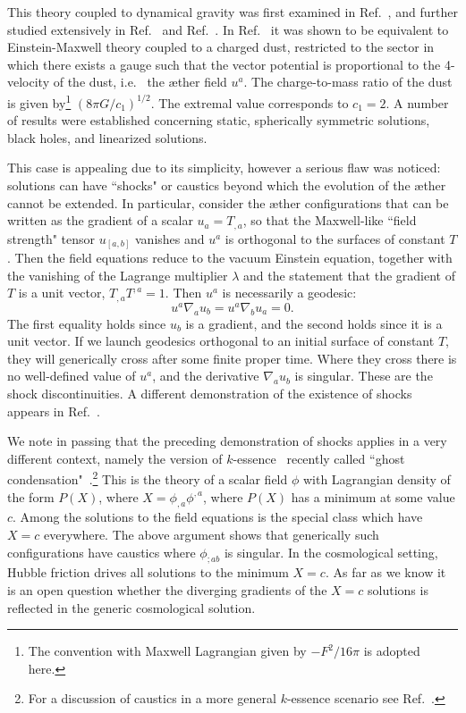 \documentclass[aps]{ws-procs9x6}
\def\beq{\begin{equation}}
\def\eeq{\end{equation}}
\def\l{\lambda}
\begin{document}
This theory coupled to dynamical gravity was first examined in
Ref.~, and further studied extensively in
Ref.~ and Ref.~. In Ref.~
it was shown to be equivalent to Einstein-Maxwell theory coupled
to a charged dust, restricted to the sector in which there exists
a gauge such that the vector potential is proportional to the
4-velocity of the dust, i.e.~ the {\ae}ther field $u^a$. The
charge-to-mass ratio of the dust is given by\footnote{The
convention with Maxwell Lagrangian given by $-F^2/16\pi$ is
adopted here.} $(8\pi G/c_1)^{1/2}$. The extremal value
corresponds to $c_1=2$. A number of results were established
concerning static, spherically symmetric solutions, black holes,
and linearized solutions.

This case is appealing due to its simplicity, however a serious
flaw was noticed: solutions can have ``shocks" or caustics beyond
which the evolution of the {\ae}ther cannot be extended. In
particular\cite{JM}, consider the {\ae}ther configurations that
can be written as the gradient of a scalar $u_a=T_{,a}$, so that
the Maxwell-like ``field strength" tensor $u_{[a,b]}$ vanishes and
$u^a$ is orthogonal to the surfaces of constant $T$. Then the
field equations reduce to the vacuum Einstein equation, together
with the vanishing of the Lagrange multiplier $\l$ and the
statement that the gradient of $T$ is a unit vector, $T_{,a}
T^{,a}=1$. Then $u^a$ is necessarily a geodesic: \beq u^a
\nabla_a u_b = u^a \nabla_b u_a = 0. \eeq The first equality
holds since $u_b$ is a gradient, and the second holds since it is
a unit vector. If we launch geodesics orthogonal to an initial
surface of constant $T$, they will generically cross after some
finite proper time. Where they cross there is no well-defined
value of $u^a$, and the derivative $\nabla_a u_b$ is singular.
These are the shock discontinuities. A different demonstration of
the existence of shocks appears in Ref.~.

We note in passing that the preceding demonstration of shocks
applies in a very different context, namely the version of
$k$-essence~\cite{kflation} recently called ``ghost
condensation"~\cite{ghostcond1,ghostcond2}.\footnote{For a
discussion of caustics in a more general $k$-essence scenario see
Ref.~.} This is the theory of a scalar field
$\phi$ with Lagrangian density of the form $P(X)$, where
$X=\phi_{,a}\phi^{,a}$, where $P(X)$ has a minimum at some value
$c$. Among the solutions to the field equations is the special
class which have $X=c$ everywhere. The above argument shows that
generically such configurations have caustics where $\phi_{;ab}$
is singular. In the cosmological setting, Hubble friction drives
all solutions to the minimum $X=c$. As far as we know it is an
open question whether the diverging gradients of the $X=c$
solutions is reflected in the generic cosmological solution.
\end{document}
